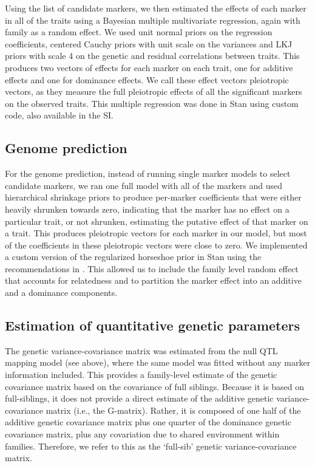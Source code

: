 \begin{refsection}
Using the list of candidate markers, we then estimated the effects of
each marker in all of the traits using a Bayesian multiple multivariate
regression, again with family as a random effect. We used unit normal
priors on the regression coefficients, centered Cauchy priors with unit
scale on the variances and LKJ priors with scale 4 on the genetic and
residual correlations between traits. This produces two vectors of
effects for each marker on each trait, one for additive effects and one
for dominance effects. We call these effect vectors pleiotropic vectors,
as they measure the full pleiotropic effects of all the significant
markers on the observed traits. This multiple regression was done in
Stan \parencite{Carpenter2017-pn} using custom code, also available in the SI.

\subsection{Genome prediction}

For the genome prediction, instead of running single marker models to
select candidate markers, we ran one full model with all of the markers
and used hierarchical shrinkage priors to produce per-marker
coefficients that were either heavily shrunken towards zero, indicating
that the marker has no effect on a particular trait, or not shrunken,
estimating the putative effect of that marker on a trait. This produces
pleiotropic vectors for each marker in our model, but most of the
coefficients in these pleiotropic vectors were close to zero. We
implemented a custom version of the regularized horseshoe prior in Stan
using the recommendations in \textcite{Piironen2017-ih}.
This allowed us to include the family level random effect that accounts
for relatedness and to partition the marker effect into an additive and
a dominance components.

\subsection{Estimation of quantitative genetic parameters}

The genetic variance-covariance matrix was estimated from the null QTL
mapping model (see above), where the same model was fitted without any
marker information included. This provides a family-level estimate of
the genetic covariance matrix based on the covariance of full siblings. Because it is
based on full-siblings, it does not provide a direct estimate of the
additive genetic variance-covariance matrix (i.e., the G-matrix).
Rather, it is composed of one half of the additive genetic covariance
matrix plus one quarter of the dominance genetic covariance matrix, plus
any covariation due to shared environment within families. Therefore, we
refer to this as the `full-sib' genetic variance-covariance matrix.


\end{refsection}
